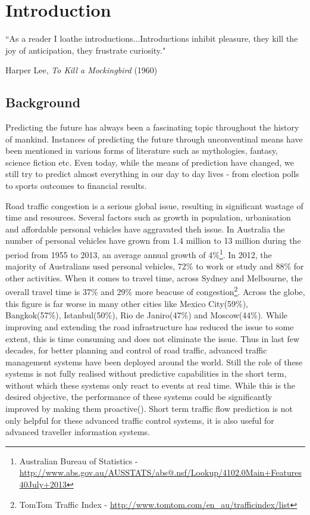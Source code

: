

\chapter{Introduction} %

\label{Chapter1} %


{``As a reader I loathe introductions...Introductions inhibit pleasure, they kill the joy of
anticipation, they frustrate curiosity."}
\begin{flushright}
Harper Lee, \textit{To Kill a Mockingbird} (1960)
\end{flushright}

\section{Background}
Predicting the future has always been a fascinating topic throughout the history of mankind.
Instances of predicting the future through unconventinal means have been mentioned in various
forms of literature such as mythologies, fantasy, science fiction etc. Even today, while the
means of prediction have changed, we still try to predict almost everything in our day to day
lives - from election polls to sports outcomes to financial results.

Road traffic congestion is a serious global issue, resulting in significant wastage of time and
resources. Several factors such as growth in population, urbanisation and affordable personal vehicles
have aggravated theh issue. In Australia the number of personal vehicles have grown from 1.4 million
to 13 million during the period from 1955 to 2013, an average annual growth of 4\%\footnote{Australian
Bureau of Statistics - \url{http://www.abs.gov.au/AUSSTATS/abs@.nsf/Lookup/4102.0Main+Features40July+2013}}.
In 2012, the majority of Australians used personal vehicles, 72\% to work or study and 88\% for other activities.
When it comes to travel time, across Sydney and Melbourne, the overall travel time is 37\% and 29\% more beacuse of
congestion\footnote{TomTom Traffic Index - \url{http://www.tomtom.com/en_au/trafficindex/list}}.
Across the globe, this figure is far worse in many other cities like Mexico City(59\%), Bangkok(57\%),
Istanbul(50\%), Rio de Janiro(47\%) and Moscow(44\%). While improving and extending the road infrastructure has
reduced the issue to some extent, this is time consuming and does not eliminate the issue.
Thus in last few decades, for better planning and control of road traffic, advanced traffic
management systems have been deployed around the world. Still the role of these systems is not
fully realised without predictive capabilities in the short term, without which these systems only
react to events at real time. While this is the desired objective, the performance of these systems
could be significantly improved by making them proactive(\citet{smith1997traffic}). Short term traffic
flow prediction is not only helpful for these advanced traffic control systems, it is also useful
for advanced traveller information systems.


